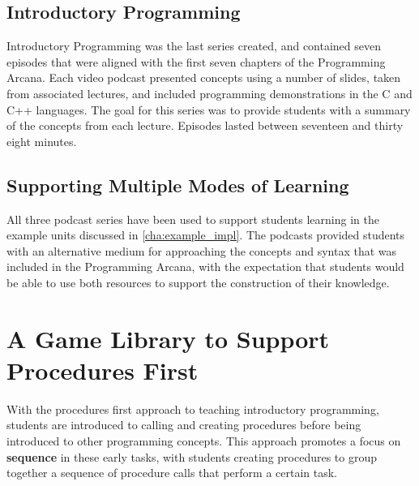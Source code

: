 
\subsection{Introductory Programming} %
\label{sub:introductory_programming}

Introductory Programming was the last series created, and contained seven episodes that were aligned with the first seven chapters of the Programming Arcana. Each video podcast presented concepts using a number of slides, taken from associated lectures, and included programming demonstrations in the C and C++ languages. The goal for this series was to provide students with a summary of the concepts from each lecture. Episodes lasted between seventeen and thirty eight minutes.


\subsection{Supporting Multiple Modes of Learning} %
\label{sub:supporting_multiple_modes_of_learning}

All three podcast series have been used to support students learning in the example units discussed in \cref{cha:example_impl}. The podcasts provided students with an alternative medium for approaching the concepts and syntax that was included in the Programming Arcana, with the expectation that students would be able to use both resources to support the construction of their knowledge.




\section{A Game Library to Support Procedures First} %
\label{sec:swingame}

With the procedures first approach to teaching introductory programming, students are introduced to calling and creating procedures before being introduced to other programming concepts. This approach promotes a focus on \textbf{sequence} in these early tasks, with students creating procedures to group together a sequence of procedure calls that perform a certain task. 


